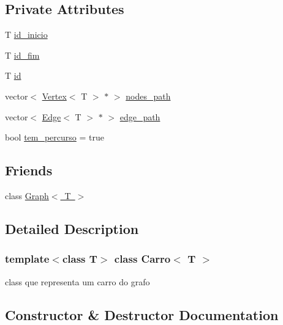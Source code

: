 \subsection*{Private Attributes}
\begin{DoxyCompactItemize}
\item 
T \mbox{\hyperlink{class_carro_ac1142f0e001f982a7789fe20514f5db7}{id\+\_\+inicio}}
\item 
T \mbox{\hyperlink{class_carro_a6d4a8cf39f76caecafa0bffcedc50efc}{id\+\_\+fim}}
\item 
T \mbox{\hyperlink{class_carro_ab7edb4871bda624992f83ef2b9d1babf}{id}}
\item 
vector$<$ \mbox{\hyperlink{class_vertex}{Vertex}}$<$ T $>$ $\ast$ $>$ \mbox{\hyperlink{class_carro_a4cc76ed6acda558805f6039ec35ca53f}{nodes\+\_\+path}}
\item 
vector$<$ \mbox{\hyperlink{class_edge}{Edge}}$<$ T $>$ $\ast$ $>$ \mbox{\hyperlink{class_carro_a2c552e1d0d83a841c3ce9def21b7956b}{edge\+\_\+path}}
\item 
bool \mbox{\hyperlink{class_carro_a6d26498b0d2bbe5729f2ba0464d873cb}{tem\+\_\+percurso}} = true
\end{DoxyCompactItemize}
\subsection*{Friends}
\begin{DoxyCompactItemize}
\item 
class \mbox{\hyperlink{class_carro_aefa9b76cd57411c5354e5620dc2d84dd}{Graph$<$ T $>$}}
\end{DoxyCompactItemize}


\subsection{Detailed Description}
\subsubsection*{template$<$class T$>$\newline
class Carro$<$ T $>$}

class que representa um carro do grafo 

\subsection{Constructor \& Destructor Documentation}
\mbox{\label{class_carro_ace81433a19d4303c0b2862f04bff8299}} 
